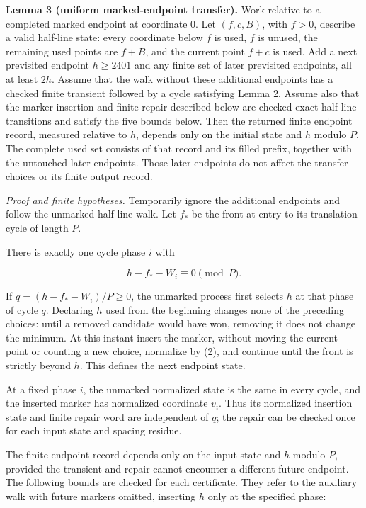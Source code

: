 \documentclass[11pt,a4paper]{article}
\begin{document}
\noindent\textbf{Lemma 3 (uniform marked-endpoint transfer).} Work relative
to a completed marked endpoint at coordinate 0. Let $(f,c,B)$, with $f>0$,
describe a valid half-line state: every coordinate below $f$ is used,
$f$ is unused, the remaining used points are $f+B$, and the current point
$f+c$ is used. Add a next previsited endpoint $h\ge2401$ and any finite set
of later previsited endpoints, all at least $2h$. Assume that the walk
without these additional endpoints has a checked finite transient followed
by a cycle satisfying Lemma 2. Assume also that the marker insertion and
finite repair described below are checked exact half-line transitions and
satisfy the five bounds below. Then the returned finite endpoint record,
measured relative to $h$, depends only on the initial state and $h$ modulo
$P$. The complete used set consists of that record and its filled prefix,
together with the untouched later endpoints. Those later endpoints do not
affect the transfer choices or its finite output record.

\emph{Proof and finite hypotheses.} Temporarily ignore the additional
endpoints and follow the unmarked half-line walk. Let $f_*$ be the front at
entry to its translation cycle of length $P$.

There is exactly one cycle phase $i$ with

\begin{equation*}
h-f_*-W_i\equiv0\pmod P.
\end{equation*}

If $q=(h-f_*-W_i)/P\ge0$, the unmarked process first selects $h$ at that phase of cycle $q$. Declaring $h$ used from the beginning changes none of the preceding choices: until a removed candidate would have won, removing it does not change the minimum. At this instant insert the marker, without moving the current point or counting a new choice, normalize by (2), and continue until the front is strictly beyond $h$. This defines the next endpoint state.

At a fixed phase $i$, the unmarked normalized state is the same in every
cycle, and the inserted marker has normalized coordinate $v_i$. Thus its
normalized insertion state and finite repair word are independent of $q$;
the repair can be checked once for each input state and spacing residue.

The finite endpoint record depends only on the input state and $h$ modulo
$P$, provided the transient and repair cannot encounter a different future
endpoint. The following bounds are checked for each certificate. They
refer to the auxiliary walk with future markers omitted, inserting $h$
only at the specified phase:
\end{document}
